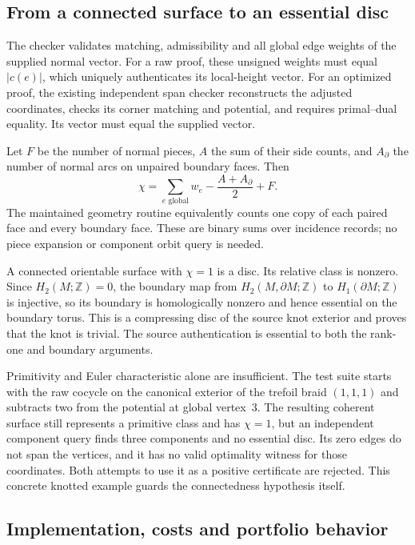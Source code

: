 \subsection{From a connected surface to an essential disc}

The checker validates matching, admissibility and all global edge weights
of the supplied normal vector. For a raw proof, these unsigned weights
must equal $|c(e)|$, which uniquely authenticates its local-height vector.
For an optimized proof, the existing independent span checker reconstructs
the adjusted coordinates, checks its corner matching and potential, and
requires primal--dual equality. Its vector must equal the supplied vector.

Let $F$ be the number of normal pieces, $A$ the sum of their side counts,
and $A_\partial$ the number of normal arcs on unpaired boundary faces.
Then
\[
 \chi=\sum_{e\text{ global}}w_e-\frac{A+A_\partial}{2}+F.
\]
The maintained geometry routine equivalently counts one copy of each
paired face and every boundary face. These are binary sums over incidence
records; no piece expansion or component orbit query is needed.

A connected orientable surface with $\chi=1$ is a disc. Its relative
class is nonzero. Since $H_2(M;\mathbb Z)=0$, the boundary map from
$H_2(M,\partial M;\mathbb Z)$ to $H_1(\partial M;\mathbb Z)$ is
injective, so its boundary is homologically nonzero and hence essential
on the boundary torus. This is a compressing disc of the source knot
exterior and proves that the knot is trivial. The source authentication
is essential to both the rank-one and boundary arguments.

Primitivity and Euler characteristic alone are insufficient. The test
suite starts with the raw cocycle on the canonical exterior of the trefoil
braid $(1,1,1)$ and subtracts two from the potential at global vertex~3.
The resulting coherent surface still represents a primitive class and
has $\chi=1$, but an independent component query finds three components
and no essential disc. Its zero edges do not span the vertices, and it
has no valid optimality witness for those coordinates. Both attempts to
use it as a positive certificate are rejected. This concrete knotted
example guards the connectedness hypothesis itself.

\subsection{Implementation, costs and portfolio behavior}

